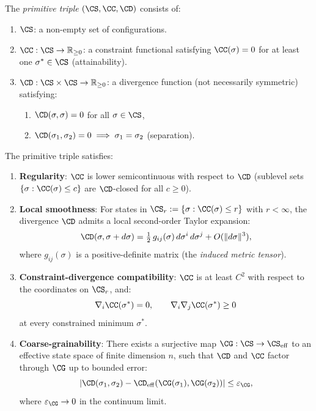 \begin{definition}\label{def:14.1}
The \emph{primitive triple} $(\CS, \CC, \CD)$ consists of:
\begin{enumerate}
  \item $\CS$: a non-empty set of configurations.
  \item $\CC : \CS \to \mathbb{R}_{\geq 0}$: a constraint functional
        satisfying $\CC(\sigma) = 0$ for at least one
        $\sigma^* \in \CS$ (attainability).
  \item $\CD : \CS \times \CS \to \mathbb{R}_{\geq 0}$: a
        divergence function (not necessarily symmetric) satisfying:
        \begin{enumerate}
          \item $\CD(\sigma, \sigma) = 0$ for all $\sigma \in \CS$,
          \item $\CD(\sigma_1, \sigma_2) = 0 \implies \sigma_1 = \sigma_2$
                (separation).
        \end{enumerate}
\end{enumerate}
\end{definition}

\begin{definition}\label{def:14.2}
The primitive triple satisfies:
\begin{enumerate}
  \item[\textbf{SA.1}] \textbf{Regularity}: $\CC$ is lower semicontinuous
        with respect to $\CD$ (sublevel sets
        $\{\sigma : \CC(\sigma) \leq c\}$ are $\CD$-closed for all
        $c \geq 0$).
  \item[\textbf{SA.2}] \textbf{Local smoothness}: For states in
        $\CS_r := \{\sigma : \CC(\sigma) \leq r\}$ with $r < \infty$,
        the divergence $\CD$ admits a local second-order Taylor expansion:
        \[
          \CD(\sigma, \sigma + d\sigma)
          = \tfrac{1}{2}\,g_{ij}(\sigma)\,d\sigma^i\,d\sigma^j
          + O(\|d\sigma\|^3),
        \]
        where $g_{ij}(\sigma)$ is a positive-definite matrix (the
        \emph{induced metric tensor}).
  \item[\textbf{SA.3}] \textbf{Constraint-divergence compatibility}:
        $\CC$ is at least $C^2$ with respect to the coordinates on
        $\CS_r$, and:
        \[
          \nabla_i \CC(\sigma^*) = 0, \qquad
          \nabla_i \nabla_j \CC(\sigma^*) \geq 0
        \]
        at every constrained minimum $\sigma^*$.
  \item[\textbf{SA.4}] \textbf{Coarse-grainability}: There exists a
        surjective map $\CG : \CS \to \CS_{\mathrm{eff}}$ to an
        effective state space of finite dimension $n$, such that $\CD$
        and $\CC$ factor through $\CG$ up to bounded error:
        \[
          |\CD(\sigma_1, \sigma_2)
          - \CD_{\mathrm{eff}}(\CG(\sigma_1), \CG(\sigma_2))|
          \leq \varepsilon_{\CG},
        \]
        where $\varepsilon_{\CG} \to 0$ in the continuum limit.
\end{enumerate}
\end{definition}

